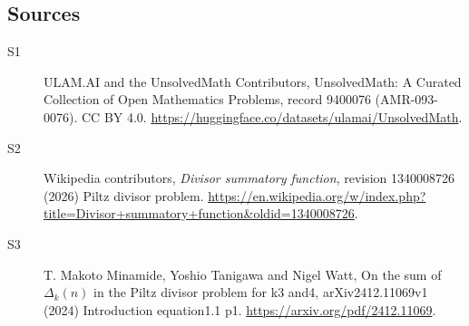 \documentclass[11pt]{article}
\begin{document}
\subsection{Sources}
\begin{description}
\item[\hypertarget{source:9400076:1}{S1}] ULAM.AI and the UnsolvedMath Contributors, UnsolvedMath: A Curated Collection of Open Mathematics Problems, record 9400076 (AMR-093-0076). CC BY 4.0. \url{https://huggingface.co/datasets/ulamai/UnsolvedMath}.
\item[\hypertarget{source:9400076:2}{S2}] Wikipedia contributors, \emph{Divisor summatory function}, revision 1340008726 (2026) Piltz divisor problem. \url{https://en.wikipedia.org/w/index.php?title=Divisor+summatory+function&oldid=1340008726}.
\item[\hypertarget{source:9400076:3}{S3}] T. Makoto Minamide, Yoshio Tanigawa and Nigel Watt, On the sum of $\Delta_k(n)$ in the Piltz divisor problem for k3 and4, arXiv2412.11069v1 (2024) Introduction equation1.1 p1. \url{https://arxiv.org/pdf/2412.11069}.
\end{description}
\label{end:9400076}
\end{document}
